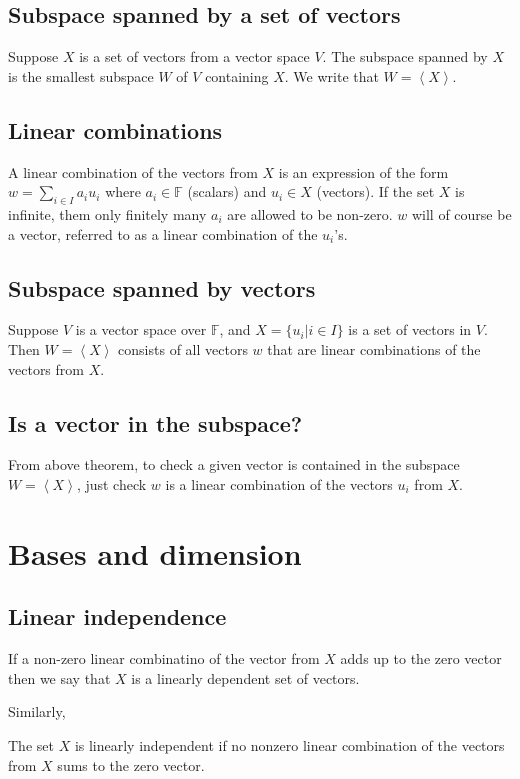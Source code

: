 \documentclass[12pt]{article}
\begin{document}
	\subsection{Subspace spanned by a set of vectors}
	\begin{thm}
		Suppose $X$ is a set of vectors from a vector space $V$. The subspace spanned by $X$ is the smallest 
		subspace $W$ of $V$ containing $X$. We write that $W = \left< X \right>$.
	\end{thm}
	
	\subsection{Linear combinations}
	\begin{defn}
		A linear combination of the vectors from $X$ is an expression of the form $w = \sum_{i \in I} a_i u_i$ 
		where $a_i \in \mathbb{F}$ (scalars) and $u_i \in X$ (vectors).	If the set $X$ is infinite, them only 
		finitely many $a_i$ are allowed to be non-zero. $w$ will of course be a vector, referred to as a linear 
		combination of the $u_i$'s.
	\end{defn}
	
	\subsection{Subspace spanned by vectors}
	\begin{thm}
		Suppose $V$ is a vector space over $\mathbb{F}$, and $X = \{ u_i | i \in I \}$ is a set of vectors 
		in $V$. Then $W=\left< X \right>$ consists of all vectors $w$ that are linear combinations of the vectors from $X$.
	\end{thm}
	
	\subsection{Is a vector in the subspace?}
	From above theorem, to check a given vector is contained in the subspace $W=\left< X \right>$, just check $w$ is a 
	linear combination of the vectors $u_i$ from $X$.

\section{Bases and dimension}
	\subsection{Linear independence}
	\begin{defn}
		If a non-zero linear combinatino of the vector from $X$ adds up to the zero vector then we say that $X$ is a linearly dependent set of vectors.
	\end{defn}
	Similarly,
	\begin{defn}
		The set $X$ is linearly independent if no nonzero linear combination of the vectors from $X$ sums to the zero vector.
	\end{defn}
	
\end{document}
